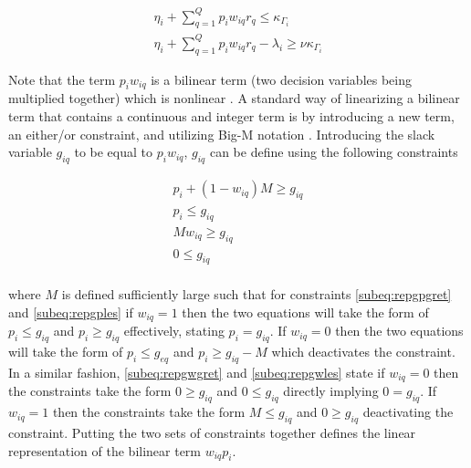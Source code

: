 \documentclass[letterpaper, 10pt, conference]{IEEEtran}
\begin{document}
\begin{subequations}
\begin{align}
    \eta_i + \sum_{q=1}^Q p_i w_{iq} r_q \leq \kappa_{\Gamma_i}                 \\
    \eta_i + \sum_{q=1}^Q p_i w_{iq} r_q - \lambda_i \geq \nu \kappa_{\Gamma_i}
\end{align}
\end{subequations}

Note that the term \(p_i w_{iq}\) is a bilinear term (two decision variables being multiplied together) which is nonlinear \cite{Rodriguez2013}. A standard way of linearizing a bilinear term that contains a continuous and integer term is by introducing a new term, an either/or constraint, and utilizing Big-M notation \cite{Chen2010,Rodriguez2013}. Introducing the slack variable \(g_{iq}\) to be equal to \(p_i w_{iq}\), \(g_{iq}\) can be define using the following constraints

\begin{subequations}
\begin{align}
    p_i + (1 - w_{iq})M \geq g_{iq}                                           \label{subeq:repgpgret}       \\
    p_i \leq g_{iq}                                                           \label{subeq:repgples}        \\
    Mw_{iq} \geq g_{iq}                                                       \label{subeq:repgwgret}       \\
    0 \leq g_{iq}                                                             \label{subeq:repgwles}        \\
\end{align}
\end{subequations}

\noindent
where \(M\) is defined sufficiently large such that for constraints \eqref{subeq:repgpgret} and \eqref{subeq:repgples} if \(w_{iq} = 1\) then the two equations will take the form of \(p_i \leq g_{iq}\) and \(p_i \geq g_{iq}\) effectively, stating \(p_i = g_{iq}\). If \(w_{iq} = 0\) then the two equations will take the form of \(p_i \leq g_{eq}\) and \(p_i \geq g_{iq} - M\) which deactivates the constraint. In a similar fashion, \eqref{subeq:repgwgret} and \eqref{subeq:repgwles} state if \(w_{iq} = 0\) then the constraints take the form \(0 \geq g_{iq}\) and \(0 \leq g_{iq}\) directly implying \(0 = g_{iq}\). If \(w_{iq} = 1\) then the constraints take the form \(M \leq g_{iq}\) and \(0 \geq g_{iq}\) deactivating the constraint. Putting the two sets of constraints together defines the linear representation of the bilinear term \(w_{iq} p_i\).
\end{document}

